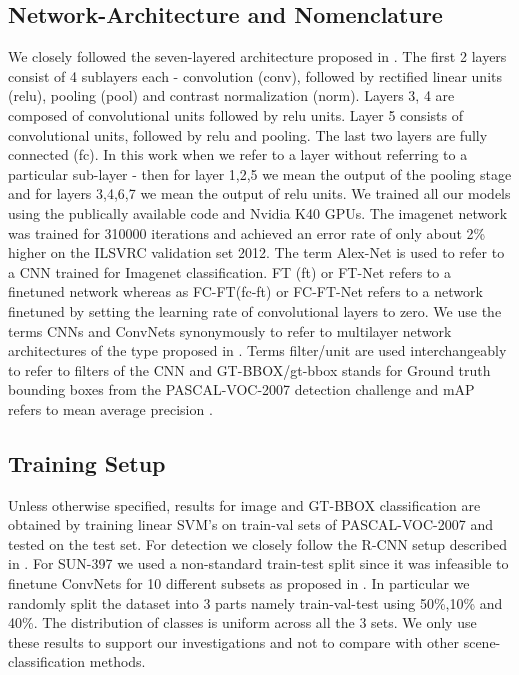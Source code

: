 \documentclass[runningheads]{llncs}
\begin{document}
\subsection{Network-Architecture and Nomenclature}
\label{sub:net-arch}
We closely followed the seven-layered architecture proposed in \cite{Kriz}. The first 2 layers consist of 4 sublayers each - convolution (conv), followed by rectified linear units (relu), pooling (pool) and contrast normalization (norm). Layers 3, 4 are composed of convolutional units followed by relu units. Layer 5 consists of convolutional units, followed by relu and pooling. The last two layers are fully connected (fc). In this work when we refer to a layer without referring to a particular sub-layer - then for layer 1,2,5 we mean the output of the pooling stage and for layers 3,4,6,7 we mean the output of relu units. We trained all our models using the publically available code \cite{caffe} and Nvidia K40 GPUs. The imagenet network was trained for 310000 iterations and achieved an error rate of only about 2\% higher on the ILSVRC validation set 2012. \newline
The term Alex-Net is used to refer to a CNN trained for Imagenet classification. FT (ft) or FT-Net refers to a finetuned network whereas as FC-FT(fc-ft) or FC-FT-Net refers to a network finetuned by setting the learning rate of convolutional layers to zero. We use the terms CNNs and ConvNets synonymously to refer to multilayer network architectures of the type proposed in \cite{Kriz}. Terms filter/unit are used interchangeably to refer to filters of the CNN and GT-BBOX/gt-bbox stands for Ground truth bounding boxes from the PASCAL-VOC-2007 detection challenge and mAP refers to mean average precision \cite{Pascal}.

\subsection{Training Setup} 
\label{sub:train-setup}
Unless otherwise specified, results for image and GT-BBOX classification are obtained by training linear SVM's on train-val sets of PASCAL-VOC-2007 \cite{Pascal} and tested on the test set. For detection we closely follow the R-CNN setup described in \cite{Rcnn}. For SUN-397 \cite{sun} we used a non-standard train-test split since it was infeasible to finetune ConvNets for 10 different subsets as proposed in \cite{sun}. In particular we randomly split the dataset into 3 parts namely train-val-test using 50\%,10\% and 40\%. The distribution of classes is uniform across all the 3 sets. We only use these results to support our investigations and not to compare with other scene-classification methods.  
 
\end{document}
